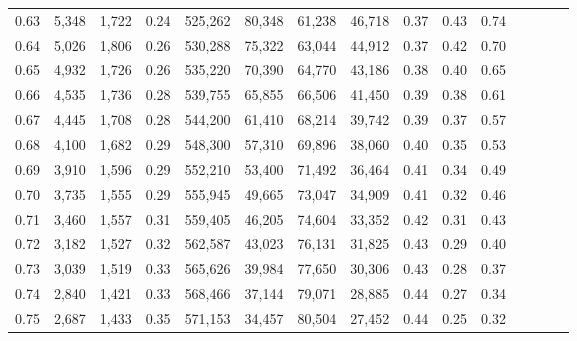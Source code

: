 \begin{tabular}{rrrcrrrrrrrrrrr}
0.63 &   5,348 &  1,722 &                                       0.24 &  525,262 &   80,348 &   61,238 &   46,718 &  0.37 &  0.43 &                         0.74 \\
0.64 &   5,026 &  1,806 &                                       0.26 &  530,288 &   75,322 &   63,044 &   44,912 &  0.37 &  0.42 &                         0.70 \\
0.65 &   4,932 &  1,726 &                                       0.26 &  535,220 &   70,390 &   64,770 &   43,186 &  0.38 &  0.40 &                         0.65 \\
0.66 &   4,535 &  1,736 &                                       0.28 &  539,755 &   65,855 &   66,506 &   41,450 &  0.39 &  0.38 &                         0.61 \\
0.67 &   4,445 &  1,708 &                                       0.28 &  544,200 &   61,410 &   68,214 &   39,742 &  0.39 &  0.37 &                         0.57 \\
0.68 &   4,100 &  1,682 &                                       0.29 &  548,300 &   57,310 &   69,896 &   38,060 &  0.40 &  0.35 &                         0.53 \\
0.69 &   3,910 &  1,596 &                                       0.29 &  552,210 &   53,400 &   71,492 &   36,464 &  0.41 &  0.34 &                         0.49 \\
0.70 &   3,735 &  1,555 &                                       0.29 &  555,945 &   49,665 &   73,047 &   34,909 &  0.41 &  0.32 &                         0.46 \\
0.71 &   3,460 &  1,557 &                                       0.31 &  559,405 &   46,205 &   74,604 &   33,352 &  0.42 &  0.31 &                         0.43 \\
0.72 &   3,182 &  1,527 &                                       0.32 &  562,587 &   43,023 &   76,131 &   31,825 &  0.43 &  0.29 &                         0.40 \\
0.73 &   3,039 &  1,519 &                                       0.33 &  565,626 &   39,984 &   77,650 &   30,306 &  0.43 &  0.28 &                         0.37 \\
0.74 &   2,840 &  1,421 &                                       0.33 &  568,466 &   37,144 &   79,071 &   28,885 &  0.44 &  0.27 &                         0.34 \\
0.75 &   2,687 &  1,433 &                                       0.35 &  571,153 &   34,457 &   80,504 &   27,452 &  0.44 &  0.25 &                         0.32 \\

\end{tabular}
